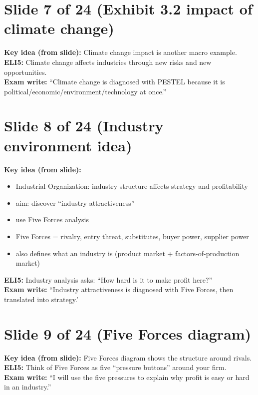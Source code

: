\documentclass[11pt,a4paper]{article}
\begin{document}
\section*{Slide 7 of 24 (Exhibit 3.2 impact of climate change)}
\textbf{Key idea (from slide):} Climate change impact is another macro example.\\
\textbf{ELI5:} Climate change affects industries through new risks and new opportunities.\\
\textbf{Exam write:} ``Climate change is diagnosed with PESTEL because it is political/economic/environment/technology at once.''

\section*{Slide 8 of 24 (Industry environment idea)}
\textbf{Key idea (from slide):}
\begin{itemize}
  \item Industrial Organization: industry structure affects strategy and profitability
  \item aim: discover ``industry attractiveness''
  \item use Five Forces analysis
  \item Five Forces = rivalry, entry threat, substitutes, buyer power, supplier power
  \item also defines what an industry is (product market + factors-of-production market)
\end{itemize}
\textbf{ELI5:} Industry analysis asks: ``How hard is it to make profit here?''\\
\textbf{Exam write:} ``Industry attractiveness is diagnosed with Five Forces, then translated into strategy.'

\section*{Slide 9 of 24 (Five Forces diagram)}
\textbf{Key idea (from slide):} Five Forces diagram shows the structure around rivals.\\
\textbf{ELI5:} Think of Five Forces as five ``pressure buttons'' around your firm.\\
\textbf{Exam write:} ``I will use the five pressures to explain why profit is easy or hard in an industry.''

\end{document}
